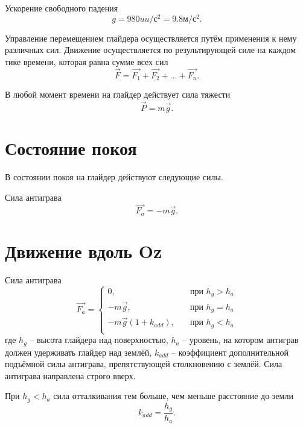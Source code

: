\documentclass[a4paper,12pt]{report}
\begin{document}
Ускорение свободного падения
\begin{equation}
g = 980uu/с^2 = 9.8м/с^2.
\end{equation}

Управление перемещением глайдера осуществляется путём применения к нему различных сил. Движение осуществляется по результирующей силе на каждом тике времени, которая равна сумме всех сил
\begin{equation}
\vec{F} = \vec{F_1} + \vec{F_2} + \dots + \vec{F_n}.
\end{equation}

В любой момент времени на глайдер действует сила тяжести
\begin{equation}
\vec{P} = m\vec{g}.
\end{equation}

\section{Состояние покоя}

В состоянии покоя на глайдер действуют следующие силы.

Сила антиграва
\begin{equation}
\vec{F_a} =
-m\vec{g}.
\end{equation}

\section{Движение вдоль Oz}

Сила антиграва
\begin{equation}
\label{antigrav_force}
\vec{F_a} =
\begin{cases}
0, & \quad \text{при } h_{g} > h_a \\
-m\vec{g}, & \quad \text{при } h_{g} = h_a \\
-m\vec{g}(1+ k_{add}), & \quad \text{при } h_{g} < h_a \\
\end{cases}
\end{equation}
где $h_{g}$ -- высота глайдера над поверхностью, $h_a$ -- уровень, на котором антиграв должен удерживать глайдер над землёй, $k_{add}$ -- коэффициент дополнительной подъёмной силы антиграва, препятствующей столкновению с землёй.
Сила антиграва направлена строго вверх.

При $h_g < h_a$ сила отталкивания тем больше, чем меньше расстояние до земли
\begin{equation}
k_{add} =\frac{h_{g}}{h_{a}}.
\end{equation}
\end{document}

